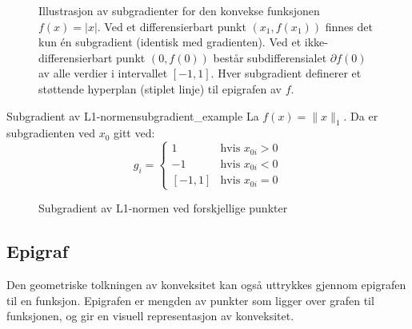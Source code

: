 \begin{figure}[H]
	\caption{Illustrasjon av subgradienter for den konvekse funksjonen $f(x) = |x|$. Ved et differensierbart punkt $(x_1,f(x_1))$ finnes det kun én subgradient (identisk med gradienten). Ved et ikke-differensierbart punkt $(0,f(0))$ består subdifferensialet $\partial f(0)$ av alle verdier i intervallet $[-1,1]$. Hver subgradient definerer et støttende hyperplan (stiplet linje) til epigrafen av $f$.}
	\label{fig:subgradients}
\end{figure}

\begin{example}{Subgradient av L1-normen}{subgradient_example}
	La \( f(x) = \|x\|_1 \). Da er subgradienten ved \( x_0 \) gitt ved:
	\[
		g_i = \begin{cases}
			1       & \text{hvis } x_{0i} > 0 \\
			-1      & \text{hvis } x_{0i} < 0 \\
			[-1, 1] & \text{hvis } x_{0i} = 0
		\end{cases}
	\]
	\begin{figure}[H]
		\centering
		\caption{Subgradient av L1-normen ved forskjellige punkter}
		\label{fig:l1_subgradient}
	\end{figure}

\end{example}

\subsection{Epigraf}
Den geometriske tolkningen av konveksitet kan også uttrykkes gjennom epigrafen til en funksjon. Epigrafen er mengden av punkter som ligger over grafen til funksjonen, og gir en visuell representasjon av konveksitet.

